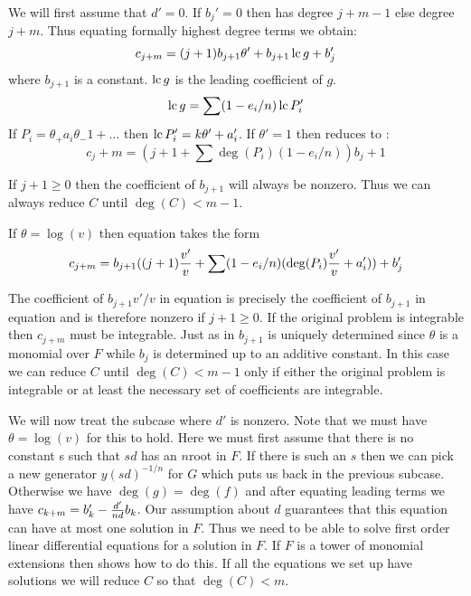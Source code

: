 We will first assume that $d' =0$. If $b_j' = 0$ then
 has degree $j+m-1$ else degree $j+m$.
Thus equating formally highest degree terms we obtain:
\begin{equation}
c_{j+m} = (j+1) b_{j+1} \theta' + b_{j+1} \operatorname{lc} g + b_j'
\label{Simple:Int:Alg:Eq:b}
\end{equation}
where $b_{j+1}$ is a constant.  $\operatorname{lc} g$ is the leading coefficient of $g$.
\[
\operatorname{lc} g = \sum (1-e_i /n) \operatorname{lc} P_i'
\]
If $P_i = \theta_ + a_i \theta_-1 + \ldots$ then $\operatorname{lc} P_i' = k
\theta' + a_i'$. If $\theta' = 1$ then 
reduces to : 
\begin{equation}
c_j+m = ( j + 1 + \sum \deg(P_i ) (1-e_i /n)) b_j+1
\label{Simple:Int:Alg:Eq:c}
\end{equation}

If $j+1 \ge 0$ then the coefficient of $b_{j+1}$ will always be
nonzero.  Thus we can always reduce $C$ until $\deg(C) < m-1$.

If $\theta = \log(v)$ then equation  takes the form
\begin{equation}
  c_{j+m} = b_{j+1} ((j+1){v' \over v} 
    + \sum (1-e_i /n) (\deg(P_i ) {v' \over v} + a_i' )) + b_j'
\label{Simple:Int:Alg:Eq:d}
\end{equation}

The coefficient of $b_{j+1} {v'} / v$ in equation
 is precisely the coefficient of $b_{j+1}$
in equation  and is therefore nonzero if
$j+1 \ge 0$.  If the original problem is integrable then $c_{j+m}$
must be integrable.  Just as in \cite{Risch1969-pi} $b_{j+1}$ is uniquely
determined since $\theta$ is a monomial over $F$ while $b_j$ is
determined up to an additive constant.  In this case we can reduce $C$
until $\deg(C) < m-1$ only if either the original problem is
integrable or at least the necessary set of coefficients are
integrable.

We will now treat the subcase where $d'$ is nonzero. Note that
we must have $\theta = \log (v)$ for this to hold. Here we must first
assume that there is no constant s such that $sd$ has an $n$\th root
in $F$.  If there is such an $s$ then we can pick a new generator 
$y (sd)^{-1/n}$ for $G$ which puts us back in the previous subcase.
Otherwise we have $\deg(g) = \deg (f)$ and after equating leading
terms we have $c_{k+m} = b_k' - {d' \over n d} b_k$.
Our assumption about $d$ guarantees that this equation can have 
at most one solution in $F$.  Thus we need to be able to solve 
first order linear differential equations for a solution in $F$.
If $F$  is a tower of monomial extensions then \cite{Risch1969-pi} shows how
to do this.  If all the equations we set up have solutions 
we will reduce $C$ so that $\deg(C) < m$.

